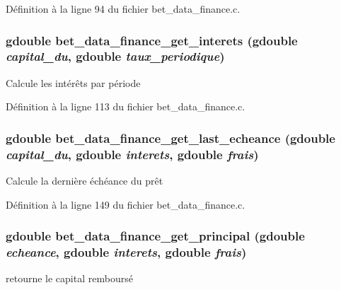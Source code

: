 Définition à la ligne 94 du fichier bet\_\-data\_\-finance.c.

\subsubsection[{bet\_\-data\_\-finance\_\-get\_\-interets}]{\setlength{\rightskip}{0pt plus 5cm}gdouble bet\_\-data\_\-finance\_\-get\_\-interets (gdouble {\em capital\_\-du}, \/  gdouble {\em taux\_\-periodique})}\label{bet__data__finance_8c_a6a129b4a8d1873a1215384ab6ccee3e6}
Calcule les intérêts par période 

Définition à la ligne 113 du fichier bet\_\-data\_\-finance.c.

\subsubsection[{bet\_\-data\_\-finance\_\-get\_\-last\_\-echeance}]{\setlength{\rightskip}{0pt plus 5cm}gdouble bet\_\-data\_\-finance\_\-get\_\-last\_\-echeance (gdouble {\em capital\_\-du}, \/  gdouble {\em interets}, \/  gdouble {\em frais})}\label{bet__data__finance_8c_a000ced710980fbd826287f66cd12a153}
Calcule la dernière échéance du prêt 

Définition à la ligne 149 du fichier bet\_\-data\_\-finance.c.

\subsubsection[{bet\_\-data\_\-finance\_\-get\_\-principal}]{\setlength{\rightskip}{0pt plus 5cm}gdouble bet\_\-data\_\-finance\_\-get\_\-principal (gdouble {\em echeance}, \/  gdouble {\em interets}, \/  gdouble {\em frais})}\label{bet__data__finance_8c_a66297619c92a4041ff4f4fe1240f212a}
retourne le capital remboursé 

